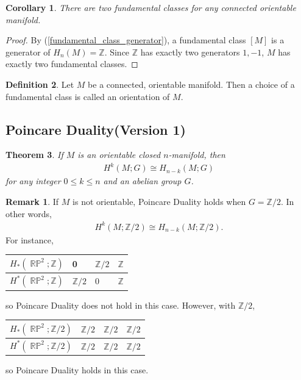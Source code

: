 \documentclass[psamsfonts]{amsart}
\newtheorem{thm}{Theorem}[section]
\newtheorem{cor}[thm]{Corollary}
\theoremstyle{definition}
\newtheorem{defn}[thm]{Definition}
\theoremstyle{rem}
\newtheorem*{rem}{Remark}
\DeclareMathOperator{\RP}{\mathbb{R}\mathbb{P}}
\numberwithin{equation}{section}
\begin{document}
\begin{cor}
  There are two fundamental classes for any connected orientable manifold.
\end{cor}

\begin{proof}
  By (\ref{fundamental_class_generator}), a fundamental class $[M]$ is a generator of $H_n(M) = \mathbb{Z}$.
  Since $\mathbb{Z}$ has exactly two generators $1, -1$, $M$ has exactly two fundamental classes.
\end{proof}

\begin{defn}
  Let $M$ be a connected, orientable manifold.
  Then a choice of a fundamental class is called an orientation of $M$.
\end{defn}

\subsection{Poincare Duality(Version 1)}

\begin{thm}\label{poincare_duality_1}
  If $M$ is an orientable closed $n$-manifold, then
  \begin{align*}
    H^k(M; G) \cong H_{n - k}(M; G)
  \end{align*}
  for any integer $0 \leq k \leq n$ and an abelian group $G$.
\end{thm}

\begin{rem}
  If $M$ is not orientable, Poincare Duality holds when $G = \mathbb{Z} / 2$.
  In other words,
  \begin{align*}
    H^k(M; \mathbb{Z} / 2) \cong H_{n - k}(M; \mathbb{Z} / 2).
  \end{align*}
  For instance,
  \begin{center}
    \begin{tabular}{| l | l | l | l |} \hline
      $H_{\ast}(\RP^2; \mathbb{Z})$ & 0                & $\mathbb{Z} / 2$ & $\mathbb{Z}$ \\ \hline
      $H^{\ast}(\RP^2; \mathbb{Z})$ & $\mathbb{Z} / 2$ & 0                & $\mathbb{Z}$ \\ \hline
    \end{tabular}
  \end{center}
  so Poincare Duality does not hold in this case.
  However, with $\mathbb{Z} / 2$,
  \begin{center}
    \begin{tabular}{| l | l | l | l |} \hline
      $H_{\ast}(\RP^2; \mathbb{Z} / 2)$ & $\mathbb{Z} / 2$ & $\mathbb{Z} / 2$ & $\mathbb{Z} / 2$ \\ \hline
      $H^{\ast}(\RP^2; \mathbb{Z} / 2)$ & $\mathbb{Z} / 2$ & $\mathbb{Z} / 2$ & $\mathbb{Z} / 2$ \\ \hline
    \end{tabular}
  \end{center}
  so Poincare Duality holds in this case.
\end{rem}
\end{document}
